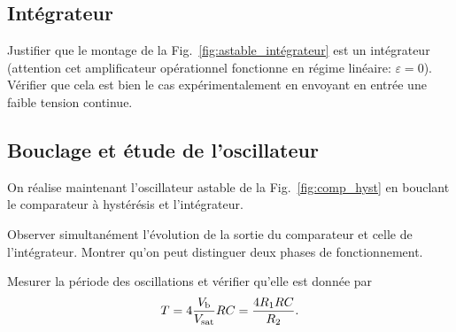\subsection{Intégrateur}

\begin{protocole}
\item Justifier que le montage de la Fig.~\ref{fig:astable_intégrateur} est un intégrateur (attention cet amplificateur opérationnel fonctionne en régime linéaire: $\varepsilon=0$). Vérifier que cela est bien le cas expérimentalement en envoyant en entrée une faible tension continue.
\end{protocole}
\subsection{Bouclage et étude de l'oscillateur}
On réalise maintenant l'oscillateur astable de la Fig.~\ref{fig:comp_hyst} en bouclant le comparateur à hystérésis et l’intégrateur.
\begin{protocole}
\item Observer simultanément l'évolution de la sortie du comparateur et celle de l'intégrateur. Montrer qu'on peut distinguer deux phases de fonctionnement.
\item Mesurer la période des oscillations et vérifier qu’elle est donnée par $$T=4\frac{V_{\rm{b}}}{V_{\rm{sat}}}RC=\frac{4R_1 RC}{R_2}.$$
\end{protocole}


